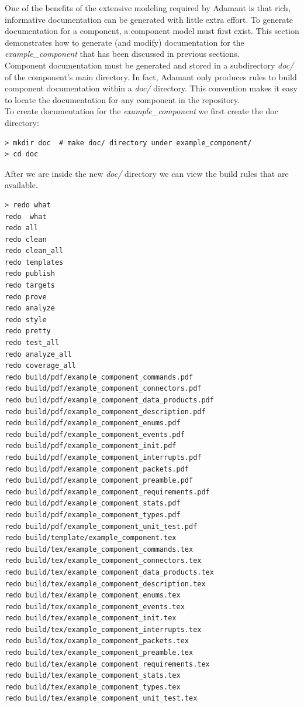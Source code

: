 One of the benefits of the extensive modeling required by Adamant is that rich, informative documentation can be generated with little extra effort. To generate documentation for a component, a component model must first exist. This section demonstrates how to generate (and modify) documentation for the \textit{example\_component} that has been discussed in previous sections. \\

Component documentation must be generated and stored in a subdirectory \textit{doc/} of the component's main directory. In fact, Adamant only produces rules to build component documentation within a \textit{doc/} directory. This convention makes it easy to locate the documentation for any component in the repository. \\

To create documentation for the \textit{example\_component} we first create the doc directory:

\vspace{5mm} %
\begin{verbatim}
> mkdir doc  # make doc/ directory under example_component/
> cd doc
\end{verbatim}
\vspace{5mm} %

After we are inside the new \textit{doc/} directory we can view the build rules that are available.

\vspace{5mm} %
\begin{verbatim}
> redo what
redo  what
redo all
redo clean
redo clean_all
redo templates
redo publish
redo targets
redo prove
redo analyze
redo style
redo pretty
redo test_all
redo analyze_all
redo coverage_all
redo build/pdf/example_component_commands.pdf
redo build/pdf/example_component_connectors.pdf
redo build/pdf/example_component_data_products.pdf
redo build/pdf/example_component_description.pdf
redo build/pdf/example_component_enums.pdf
redo build/pdf/example_component_events.pdf
redo build/pdf/example_component_init.pdf
redo build/pdf/example_component_interrupts.pdf
redo build/pdf/example_component_packets.pdf
redo build/pdf/example_component_preamble.pdf
redo build/pdf/example_component_requirements.pdf
redo build/pdf/example_component_stats.pdf
redo build/pdf/example_component_types.pdf
redo build/pdf/example_component_unit_test.pdf
redo build/template/example_component.tex
redo build/tex/example_component_commands.tex
redo build/tex/example_component_connectors.tex
redo build/tex/example_component_data_products.tex
redo build/tex/example_component_description.tex
redo build/tex/example_component_enums.tex
redo build/tex/example_component_events.tex
redo build/tex/example_component_init.tex
redo build/tex/example_component_interrupts.tex
redo build/tex/example_component_packets.tex
redo build/tex/example_component_preamble.tex
redo build/tex/example_component_requirements.tex
redo build/tex/example_component_stats.tex
redo build/tex/example_component_types.tex
redo build/tex/example_component_unit_test.tex
\end{verbatim}
\vspace{5mm} %

